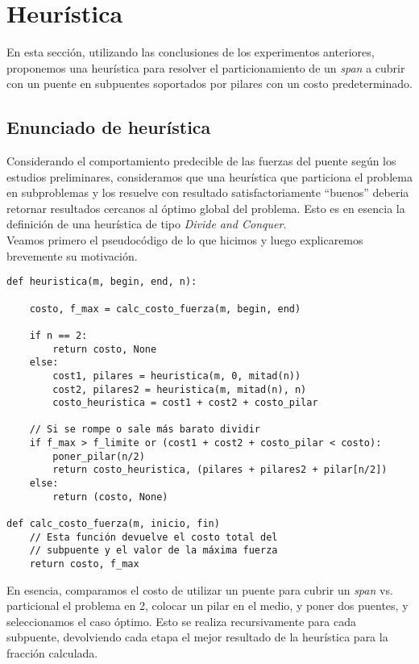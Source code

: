\section{Heurística}

En esta sección, utilizando las conclusiones de los experimentos anteriores, proponemos una heurística para resolver el particionamiento de un \textit{span} a cubrir con un puente en subpuentes soportados por pilares con un costo predeterminado.\\

\subsection{Enunciado de heurística}

Considerando el comportamiento predecible de las fuerzas del puente según los estudios preliminares, consideramos que una heurística que particiona el problema en subproblemas y los resuelve con resultado satisfactoriamente ``buenos'' deberia retornar resultados cercanos al óptimo global del problema. Esto es en esencia la definición de una heurística de tipo \textit{Divide and Conquer}.\\

Veamos primero el pseudocódigo de lo que hicimos y luego explicaremos brevemente su motivación.\\

\begin{verbatim}
def heuristica(m, begin, end, n):

    costo, f_max = calc_costo_fuerza(m, begin, end)

    if n == 2:
        return costo, None
    else:
        cost1, pilares = heuristica(m, 0, mitad(n))
        cost2, pilares2 = heuristica(m, mitad(n), n)
        costo_heuristica = cost1 + cost2 + costo_pilar

    // Si se rompe o sale más barato dividir
    if f_max > f_limite or (cost1 + cost2 + costo_pilar < costo):
        poner_pilar(n/2)
        return costo_heuristica, (pilares + pilares2 + pilar[n/2])
    else:
        return (costo, None)
                        
def calc_costo_fuerza(m, inicio, fin)
    // Esta función devuelve el costo total del
    // subpuente y el valor de la máxima fuerza
    return costo, f_max
\end{verbatim}

En esencia, comparamos el costo de utilizar un puente para cubrir un \textit{span} vs. particional el problema en 2, colocar un pilar en el medio, y poner dos puentes, y seleccionamos el caso óptimo. Esto se realiza recursivamente para cada subpuente, devolviendo cada etapa el mejor resultado de la heurística para la fracción calculada.

